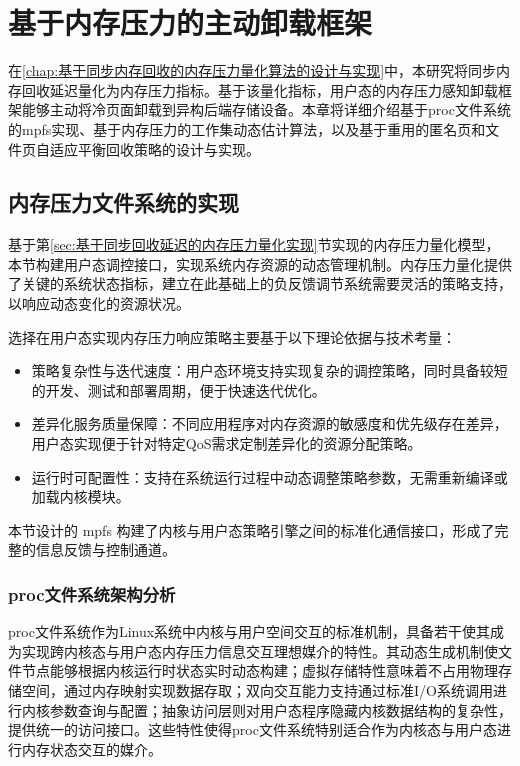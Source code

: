 \chapter{基于内存压力的主动卸载框架}
\label{chap:基于内存压力的自动卸载框架}

在\ref{chap:基于同步内存回收的内存压力量化算法的设计与实现}中，本研究将同步内存回收延迟量化为内存压力指标。基于该量化指标，用户态的内存压力感知卸载框架能够主动将冷页面卸载到异构后端存储设备。本章将详细介绍基于proc文件系统的mpfs实现、基于内存压力的工作集动态估计算法，以及基于重用的匿名页和文件页自适应平衡回收策略的设计与实现。




\section{内存压力文件系统的实现}
\label{sec:mpfs_implementation}

基于第\ref{sec:基于同步回收延迟的内存压力量化实现}节实现的内存压力量化模型，本节构建用户态调控接口，实现系统内存资源的动态管理机制。内存压力量化提供了关键的系统状态指标，建立在此基础上的负反馈调节系统需要灵活的策略支持，以响应动态变化的资源状况。

选择在用户态实现内存压力响应策略主要基于以下理论依据与技术考量：

\begin{itemize}
    \item 策略复杂性与迭代速度：用户态环境支持实现复杂的调控策略，同时具备较短的开发、测试和部署周期，便于快速迭代优化。
    \item 差异化服务质量保障：不同应用程序对内存资源的敏感度和优先级存在差异，用户态实现便于针对特定QoS需求定制差异化的资源分配策略。
    \item 运行时可配置性：支持在系统运行过程中动态调整策略参数，无需重新编译或加载内核模块。
\end{itemize}

本节设计的 mpfs 构建了内核与用户态策略引擎之间的标准化通信接口，形成了完整的信息反馈与控制通道。

\subsection{proc文件系统架构分析}

proc文件系统作为Linux系统中内核与用户空间交互的标准机制，具备若干使其成为实现跨内核态与用户态内存压力信息交互理想媒介的特性。其动态生成机制使文件节点能够根据内核运行时状态实时动态构建；虚拟存储特性意味着不占用物理存储空间，通过内存映射实现数据存取；双向交互能力支持通过标准I/O系统调用进行内核参数查询与配置；抽象访问层则对用户态程序隐藏内核数据结构的复杂性，提供统一的访问接口。这些特性使得proc文件系统特别适合作为内核态与用户态进行内存状态交互的媒介。

